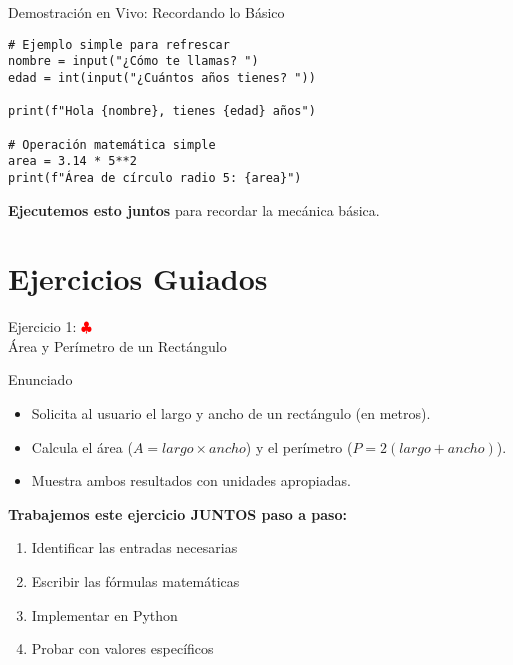 \documentclass[10pt]{beamer}
\begin{document}
\begin{frame}[fragile]{Demostración en Vivo: Recordando lo Básico}
\begin{verbatim}
# Ejemplo simple para refrescar
nombre = input("¿Cómo te llamas? ")
edad = int(input("¿Cuántos años tienes? "))

print(f"Hola {nombre}, tienes {edad} años")

# Operación matemática simple
area = 3.14 * 5**2
print(f"Área de círculo radio 5: {area}")
\end{verbatim}

\textbf{Ejecutemos esto juntos} para recordar la mecánica básica.
\end{frame}

\section{Ejercicios Guiados}

\begin{frame}{Ejercicio 1: \hfill \textcolor{red}{$\clubsuit$} \\ Área y Perímetro de un Rectángulo}
  \begin{block}{Enunciado}
    \begin{itemize}
      \item Solicita al usuario el largo y ancho de un rectángulo (en metros).
      \item Calcula el área (\(A = largo \times ancho\)) y el perímetro (\(P = 2(largo + ancho)\)).
      \item Muestra ambos resultados con unidades apropiadas.
    \end{itemize}
  \end{block}
  
  \textbf{Trabajemos este ejercicio JUNTOS paso a paso:}
  \begin{enumerate}
    \item Identificar las entradas necesarias
    \item Escribir las fórmulas matemáticas
    \item Implementar en Python
    \item Probar con valores específicos
  \end{enumerate}
\end{frame}
\end{document}
